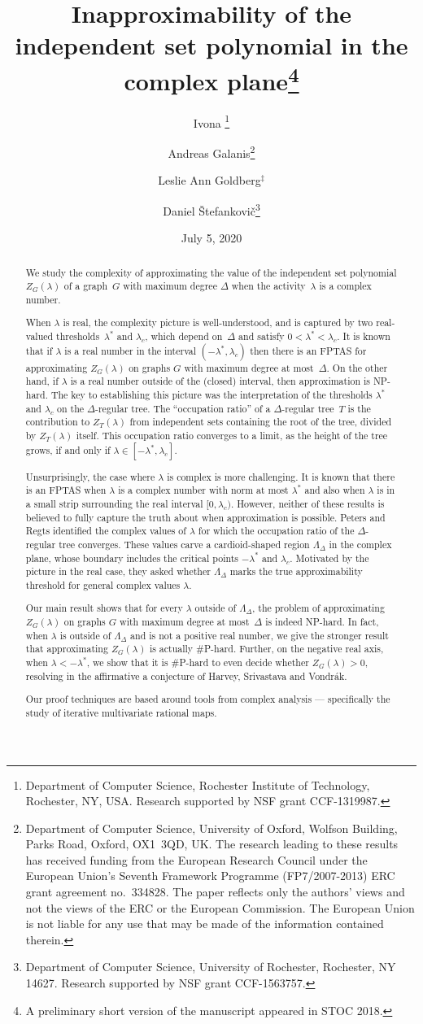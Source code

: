\documentclass[11pt]{article}
\title{Inapproximability of the independent set polynomial in the complex plane\footnote{A preliminary short version of the manuscript appeared in STOC 2018.}}
\author{
Ivona \Bezakova\thanks{
  Department of Computer Science, Rochester Institute of Technology, Rochester, NY, USA. Research
supported by NSF grant CCF-1319987.} \and
Andreas Galanis\thanks{
  Department of Computer Science, University of Oxford, Wolfson Building, Parks Road, Oxford, OX1~3QD, UK.
  The research leading to these results has received funding from the European Research Council under
  the European Union's Seventh Framework Programme (FP7/2007-2013) ERC grant agreement no.\ 334828. The paper
  reflects only the authors' views and not the views of the ERC or the European Commission.
  The European Union is not liable for any use that may be made of the information contained therein.}
  \and
  Leslie Ann Goldberg$^\ddag$
\and
 Daniel \v{S}tefankovi\v{c}\thanks{
Department of Computer Science, University of Rochester,
Rochester, NY 14627.  Research
supported by NSF grant CCF-1563757.}
 }
\date{July 5, 2020}
\def\LambdaD{\Lambda_\Delta}
\begin{document}
\maketitle
\thispagestyle{empty}
\begin{abstract} 

We study the complexity of approximating the value of the independent set  polynomial $Z_G(\lambda)$
of a graph~$G$ with maximum degree $\Delta$ when the activity~$\lambda$ is a complex number.

When $\lambda$ is real,  
the complexity picture is well-understood, and is captured by two 
real-valued thresholds~$\lambda^*$ and $\lambda_c$, which depend on~$\Delta$ and satisfy
$0<\lambda^*<\lambda_c$. It is known that if $\lambda$ is a
real number in the interval $(-\lambda^*,\lambda_c)$
then there is an FPTAS for approximating $Z_G(\lambda)$ on 
graphs $G$ with maximum degree at most~$\Delta$.
On the other hand, if $\lambda$ is a real number outside of the (closed)
interval, then approximation is NP-hard. The key to establishing this picture was the interpretation of the thresholds $\lambda^*$ and $\lambda_c$ on the $\Delta$-regular tree.
The ``occupation ratio'' of a $\Delta$-regular tree~$T$ is
the contribution to $Z_T(\lambda)$ from independent sets containing the root of the tree,
divided by $Z_T(\lambda)$ itself.
This occupation ratio converges to a limit,
as the height of the tree grows,  if and only if $\lambda\in [-\lambda^*,\lambda_c]$.



Unsurprisingly, the case where $\lambda$ is complex is more challenging.  
It is known that there is an FPTAS when
$\lambda$ is a complex number  with norm at most $\lambda^*$
and  also when $\lambda$ is in a small strip surrounding the real interval $[0,\lambda_c)$.
However, neither of these results is believed to fully capture the truth about
when approximation is possible.  Peters and Regts identified the complex values of $\lambda$ for which 
the occupation  ratio of the $\Delta$-regular tree converges. These values carve a cardioid-shaped region $\LambdaD$ 
in the complex plane, whose boundary
  includes the critical points $-\lambda^*$ and $\lambda_c$. Motivated by the picture in the real case, they asked whether $\LambdaD$ marks the true approximability threshold for general complex values $\lambda$. 

Our main result shows that for every $\lambda$ outside of $\LambdaD$, 
the problem of approximating $Z_G(\lambda)$ on graphs $G$ with maximum degree at most~$\Delta$
is  indeed NP-hard.  In fact, when 
$\lambda$ is outside of $\LambdaD$ and  is not a positive real number, we give the stronger result
that approximating $Z_G(\lambda)$ is actually \#P-hard.
Further, on the negative real axis, when $\lambda < - \lambda^*$, we show that it is \#P-hard to even decide 
whether $Z_G(\lambda)>0$, resolving in the affirmative a conjecture of 
Harvey, Srivastava and Vondr\'ak. 

Our proof techniques are
based around tools from complex analysis --- specifically 
the study of iterative multivariate rational maps.
\end{abstract}
\end{document}
